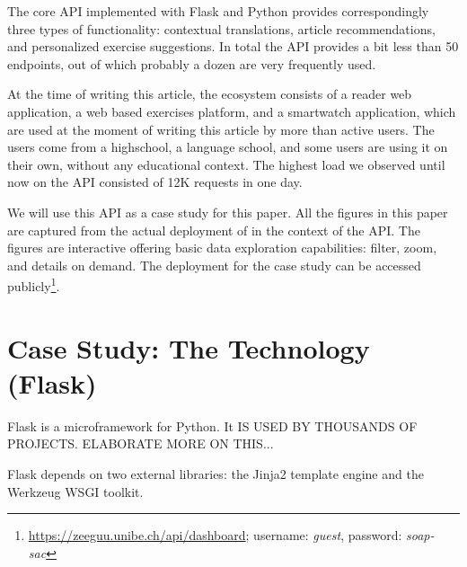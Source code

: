   The core API implemented with Flask and Python provides correspondingly three types of functionality: contextual translations, article recommendations, and personalized exercise suggestions. In total the API provides a bit less than 50 endpoints, out of which probably a dozen are very frequently used. 

  At the time of writing this article, the ecosystem consists of a reader web application, a web based exercises platform, and a smartwatch application, which are used at the moment of writing this article by more than \activeUserCount active users. The users come from a highschool, a language school, and some users are using it on their own, without any educational context. The highest load we observed until now on the API consisted of 12K requests in one day.

  
  We will use this \zee API as a case study for this paper. 
  All the figures in this paper are captured from the actual deployment of \tool in the context of the \zee API. The figures are interactive offering basic data exploration capabilities: filter, zoom, and details on demand\cite{Shne99a}. The \tool deployment for the case study can be accessed publicly\footnote{\url{https://zeeguu.unibe.ch/api/dashboard}; username: {\em guest}, password: {\em soap-sac}}. 


\newpage



\section{Case Study: The Technology (Flask)}
\label{sec:tool}

 Flask is a microframework for Python. It IS USED BY THOUSANDS OF PROJECTS. ELABORATE MORE ON THIS... 
 \vspace{2cm}

 Flask depends on two external libraries: the Jinja2 template engine and the Werkzeug WSGI toolkit. 

